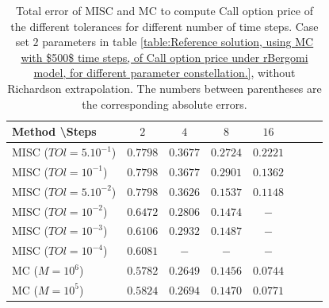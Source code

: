\documentclass[11pt]{article}
\begin{document}
\begin{table}[h!]
	\centering
	\begin{tabular}{l*{6}{c}r}
		Method \textbackslash  Steps            & $2$ & $4$ & $8$ & $16$  \\
		\hline
		MISC ($TOl=5.10^{-1}$)  & $\mathbf{0.7798}$ & $\mathbf{0.3677}$ & $\mathbf{ 0.2724}$ & $\mathbf{ 0.2221}$  \\
		MISC ($TOl=10^{-1}$)  & $\mathbf{ 0.7798
		}$ & $\mathbf{ 0.3677
	}$ & $\mathbf{ 0.2901
}$ & $\mathbf{0.1362}$  \\
		MISC ($TOl=5.10^{-2}$)  &$\mathbf{0.7798
		}$ & $\mathbf{   0.3626
	}$ & $\mathbf{  0.1537}$ & $\mathbf{ 0.1148}$  \\
		MISC ($TOl=10^{-2}$)  & $\mathbf{ 0.6472}$ & $\mathbf{0.2806
		}$ & $\mathbf{ 0.1474}$ & $\mathbf{-}$  \\
	MISC ($TOl=10^{-3}$)        & $\mathbf{0.6106}$  &$\mathbf{0.2932}$  &  $\mathbf{0.1487}$ &  $-$ \\
		MISC ($TOl=10^{-4}$)        & $\mathbf{0.6081}$  &$-$  &  $-$ &  $-$ \\
	\hline
		MC  ($M=10^6$)   & $\mathbf{0.5782}$  & $ \mathbf{  0.2649
		}$  & $\mathbf{0.1456}$ & $\mathbf{0.0744}$  \\	
			
			MC  ($M=10^5$)   & $\mathbf{0.5824}$  & $ \mathbf{  0.2694
		}$  & $\mathbf{0.1470}$ & $\mathbf{0.0771}$  \\	
		\hline
	\end{tabular}
	\caption{Total error of MISC and MC to compute Call option price of the different tolerances for different number of time steps. Case  set $2$ parameters in table \ref{table:Reference solution, using MC with $500$ time steps, of Call option price under rBergomi model, for different parameter constellation.}, without Richardson extrapolation. The numbers between parentheses are the corresponding absolute errors.}
	\label{Total error of MISC and MC to compute Call option price of the different tolerances for different number of time steps. Case $K=1$, $H=0.07$, without Richardson extrapolation. The numbers between parentheses are the corresponding absolute errors.}
\end{table}
\end{document}
